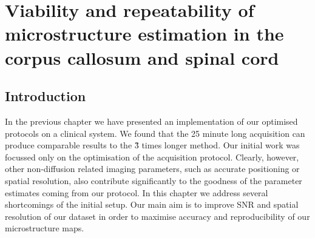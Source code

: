 
%

\newsavebox{\poorBox}
\savebox{\poorBox}{\textcolor{red}{\rule{0.05in}{0.05in}}}
\newsavebox{\fairBox}
\savebox{\fairBox}{\textcolor{orange}{\rule{0.05in}{0.05in}}}
\newsavebox{\moderateBox}
\savebox{\moderateBox}{\textcolor{yellow}{\rule{0.05in}{0.05in}}}
\newsavebox{\substantialBox}
\savebox{\substantialBox}{\textcolor{lime}{\rule{0.05in}{0.05in}}}
\newsavebox{\perfectBox}
\savebox{\perfectBox}{\textcolor{green}{\rule{0.05in}{0.05in}}}


\chapter[Microstructure estimates in CC and SC]{Viability and repeatability of microstructure estimation in the corpus callosum and spinal cord}
\label{chapter9}
\section{Introduction}
In the previous chapter we have presented an implementation of our {\SFasym} optimised protocols on a clinical system. We found that the 25 minute long \SFasym{} acquisition can produce comparable results to the \~3 times longer \OI{} method. Our initial work was focussed only on the optimisation of the acquisition protocol. Clearly, however, other non-diffusion related imaging parameters, such as accurate positioning or spatial resolution, also contribute significantly to the goodness of the parameter estimates coming from our protocol. In this chapter we address several shortcomings of the initial \SFasym{} setup. Our main aim is to improve \gls{SNR} and spatial resolution of our dataset in order to maximise accuracy and reproducibility of our microstructure maps. 


